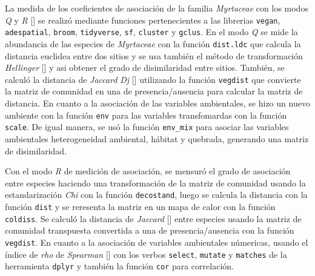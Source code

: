 \documentclass[11pt,]{article}
\begin{document}
La medida de los coeficientes de asociación de la familia
\emph{Myrtaceae} con los modos \emph{Q} y \emph{R} {[}{]} se realizó
mediante funciones pertenecientes a las librerias \texttt{vegan},
\texttt{adespatial}, \texttt{broom}, \texttt{tidyverse}, \texttt{sf},
\texttt{cluster} y \texttt{gclus}. En el modo \emph{Q} se mide la
abundancia de las especies de \emph{Myrtaceae} con la función
\texttt{dist.ldc} que calcula la distancia euclidea entre dos sitios y
se usa también el método de transformación \emph{Hellinger} {[}{]} y asi
obtener el grado de disimilaridad entre sitios. También, se calculó la
distancia de \emph{Jaccard} \emph{Dj} {[}{]} utilizando la función
\texttt{vegdist} que convierte la matriz de comunidad en una de
presencia/ausencia para calcular la matriz de distancia. En cuanto a la
asociación de las variables ambientales, se hizo un nuevo ambiente con
la función \texttt{env} para las variables transfomardas con la función
\texttt{scale}. De igual manera, se usó la función \texttt{env\_mix}
para asociar las variables ambientales heterogeneidad ambiental, hábitat
y quebrada, generando una matriz de disimilaridad.

Con el modo \emph{R} de medición de asociación, se mensuró el grado de
asociación entre especies haciendo una transformación de la matriz de
comunidad usando la estandarización \emph{Chi} con la función
\texttt{decostand}, luego se calcula la distancia con la función
\texttt{dist} y se reresenta la matriz en un mapa de calor con la
función \texttt{coldiss}. Se calculó la distancia de \emph{Jaccard}
{[}{]} entre especies usando la matriz de comunidad transpuesta
convertida a una de presencia/ausencia con la función \texttt{vegdist}.
En cuanto a la asociación de variables ambientales númericas, usando el
índice de \emph{rho} de \emph{Spearman} {[}{]} con los verbos
\texttt{select}, \texttt{mutate} y \texttt{matches} de la herramienta
\texttt{dplyr} y también la función \texttt{cor} para correlación.
\end{document}
